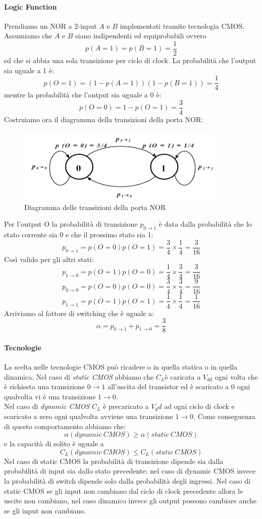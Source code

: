 \paragraph{Logic Function} Prendiamo un NOR a 2-input $A$ e $B$ implementati tramite tecnologia CMOS.
Assumiamo che $A$ e $B$ siano indipendenti ed equiprobabili ovvero 
$$p(A = 1)=p(B = 1)=\frac{1}{2}$$
ed che si abbia una sola transizione per ciclo di clock.
La probabilità che l'output sia uguale a 1 è:
$$p(O = 1)= (1-p(A = 1))(1-p(B = 1)) = \frac{1}{4}$$
mentre la probabilità che l'output sia uguale a 0 è:
$$p(O = 0) = 1- p(O = 1) = \frac{3}{4}$$
Costruiamo ora il diagramma della transizioni della porta NOR:
\begin{figure}
\centering
\includegraphics[width=10cm]{img/logicFSM.png}
\caption{Diagramma delle transizioni della porta NOR}\label{fig:logicFSM}
\end{figure}
Per l'output O la probabilità di transizione $p_{0\rightarrow1}$ è data dalla probabilità che lo stato corrente sia 0 e che il prossimo stato sia 1:
$$p_{0\rightarrow 1}= p(O = 0)p(O = 1)= \frac{3}{4}\times\frac{1}{4} = \frac{3}{16}$$
Così valido per gli altri stati:
$$p_{1\rightarrow 0}= p(O = 1)p(O = 0)= \frac{1}{4}\times\frac{3}{4} = \frac{3}{16}$$
$$p_{0\rightarrow 0}= p(O = 0)p(O = 0)= \frac{3}{4}\times\frac{3}{4} = \frac{9}{16}$$
$$p_{1\rightarrow 1}= p(O = 1)p(O = 1)= \frac{1}{4}\times\frac{1}{4} = \frac{1}{16}$$
Arriviamo al fattore di switching che è uguale a:
$$\alpha = p_{0\rightarrow 1} + p_{1\rightarrow 0} = \frac{3}{8}$$
\paragraph{Tecnologie}
La scelta nelle tecnologie CMOS può ricadere o in quella statica o in quella dinamica.
Nel caso di \emph{static CMOS} abbiamo che $C_L$è caricata a $V_{dd}$ ogni volta che è richiesta una transizione $0 \rightarrow 1$ all'uscita del transistor ed è scaricato a 0 ogni qualvolta vi è una transizione $1 \rightarrow 0$.\\
Nel caso di \emph{dynamic CMOS} $C_L$ è precaricato a $V_dd$ ad ogni ciclo di clock e scaricato a zero ogni qualvolta avviene una transizione $1 \rightarrow 0$. Come conseguenza di questo comportamento abbiamo che:
$$\alpha(dynamic \ CMOS) \geq \alpha(static \ CMOS)$$
e la capacità di solito è uguale a 
$$C_L(dynamic \ CMOS) \leq C_L(static \ CMOS)$$
Nel caso di static CMOS la probabilità di transizione dipende sia dalla probabilità di input sia dallo stato precedente; nel caso di dynamic CMOS invece la probabilità di switch dipende solo dalla probabilità degli ingressi.
Nel caso di static CMOS se gli input non cambiano dal ciclo di clock precedente allora le uscite non cambiano, nel caso dinamico invece gli output possono cambiare anche se gli input non cambiano.
